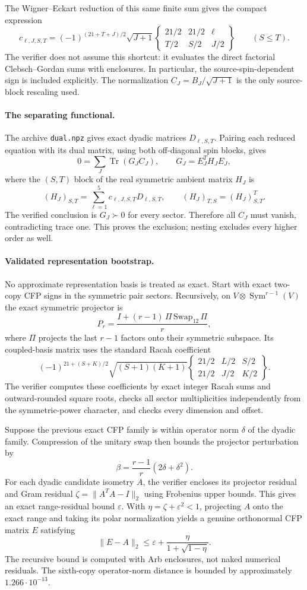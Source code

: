 \documentclass[11pt]{article}
\newcommand{\Tr}{\operatorname{Tr}}
\newcommand{\Sym}{\operatorname{Sym}}
\begin{document}
The Wigner--Eckart reduction of this same finite sum gives the compact expression
\[
 c_{\ell,J,S,T}=(-1)^{(21+T+J)/2}\sqrt{J+1}
 \begin{Bmatrix}21/2&21/2&\ell\\ T/2&S/2&J/2\end{Bmatrix}
 \qquad(S\le T).
\]
The verifier does not assume this shortcut: it evaluates the direct factorial Clebsch--Gordan sums with enclosures. In particular, the source-spin-dependent sign is included explicitly. The normalization $C_J=B_J/\sqrt{J+1}$ is the only source-block rescaling used.

\paragraph{The separating functional.}
The archive \texttt{dual.npz} gives exact dyadic matrices $D_{\ell,S,T}$. Pairing each reduced equation with its dual matrix, using both off-diagonal spin blocks, gives
\[
 0=\sum_J\Tr(G_J C_J),\qquad
 G_J=E_J^T H_J E_J,
\]
where the $(S,T)$ block of the real symmetric ambient matrix $H_J$ is
\[
 (H_J)_{S,T}=\sum_{\ell=1}^{5}c_{\ell,J,S,T}D_{\ell,S,T},
 \qquad(H_J)_{T,S}=(H_J)_{S,T}^T.
\]
The verified conclusion is $G_J\succ0$ for every sector. Therefore all $C_J$ must vanish, contradicting trace one. This proves the exclusion; nesting excludes every higher order as well.

\paragraph{Validated representation bootstrap.}
No approximate representation basis is treated as exact. Start with exact two-copy CFP signs in the symmetric pair sectors. Recursively, on $V\otimes\Sym^{r-1}(V)$ the exact symmetric projector is
\[
 P_r=\frac{I+(r-1)\,\Pi\,\mathrm{Swap}_{12}\,\Pi}{r},
\]
where $\Pi$ projects the last $r-1$ factors onto their symmetric subspace. Its coupled-basis matrix uses the standard Racah coefficient
\[
 (-1)^{21+(S+K)/2}\sqrt{(S+1)(K+1)}
 \begin{Bmatrix}21/2&L/2&S/2\\21/2&J/2&K/2\end{Bmatrix}.
\]
The verifier computes these coefficients by exact integer Racah sums and outward-rounded square roots, checks all sector multiplicities independently from the symmetric-power character, and checks every dimension and offset.

Suppose the previous exact CFP family is within operator norm $\delta$ of the dyadic family. Compression of the unitary swap then bounds the projector perturbation by
\[
 \beta=\frac{r-1}{r}(2\delta+\delta^2).
\]
For each dyadic candidate isometry $A$, the verifier encloses its projector residual and Gram residual $\zeta=\|A^TA-I\|_2$ using Frobenius upper bounds. This gives an exact range-residual bound $\varepsilon$. With $\eta=\zeta+\varepsilon^2<1$, projecting $A$ onto the exact range and taking its polar normalization yields a genuine orthonormal CFP matrix $E$ satisfying
\[
 \|E-A\|_2\le\varepsilon+
 \frac{\eta}{1+\sqrt{1-\eta}}.
\]
The recursive bound is computed with Arb enclosures, not naked numerical residuals. The sixth-copy operator-norm distance is bounded by approximately $1.266\cdot10^{-13}$.
\end{document}

